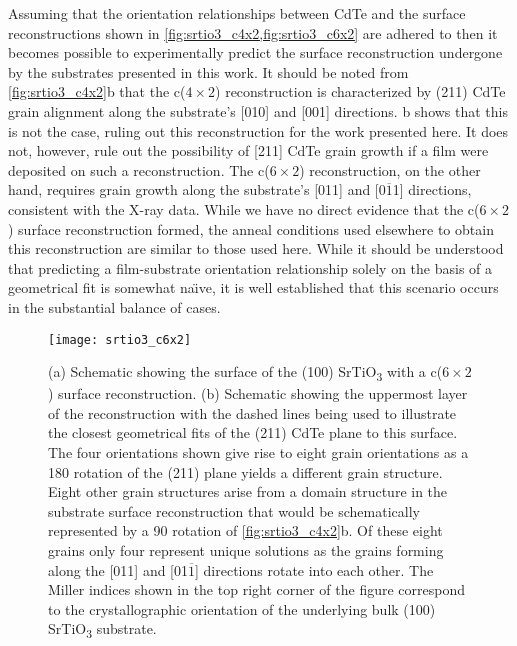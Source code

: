 Assuming that the orientation relationships between CdTe and the surface reconstructions shown in \cref{fig:srtio3_c4x2,fig:srtio3_c6x2} are adhered to then it becomes possible to experimentally predict the surface reconstruction undergone by the substrates presented in this work.
It should be noted from \cref{fig:srtio3_c4x2}b that the c(\(4\times2\)) reconstruction is characterized by (211) CdTe grain alignment along the substrate's [010] and [001] directions.
b shows that this is not the case, ruling out this reconstruction for the work presented here.
It does not, however, rule out the possibility of [211] CdTe grain growth if a film were deposited on such a reconstruction.
The c(\(6\times2\)) reconstruction, on the other hand, requires grain growth along the substrate's [011] and [0\(\overline{1}\)1] directions, consistent with the X-ray data.
While we have no direct evidence that the c(\(6\times2\)) surface reconstruction formed, the anneal conditions used elsewhere\cite{Jiang1996} to obtain this reconstruction are similar to those used here.
While it should be understood that predicting a film-substrate orientation relationship solely on the basis of a geometrical fit is somewhat na\"{\i}ve, it is well established that this scenario occurs in the substantial balance of cases.
\begin{figure}
 \centering \texttt{[image: srtio3\_c6x2]}
 \caption[CdTe on c(6\(\times\)2) SrTiO\textsubscript{3} surface]{\label{fig:srtio3_c6x2}(a) Schematic showing the surface of the (100) SrTiO\textsubscript{3} with a c(\(6\times2\)) surface reconstruction.
  (b) Schematic showing the uppermost layer of the reconstruction with the dashed lines being used to illustrate the closest geometrical fits of the (211) CdTe plane to this surface.
  The four orientations shown give rise to eight grain orientations as a 180\degree{} rotation of the (211) plane yields a different grain structure.
  Eight other grain structures arise from a domain structure in the substrate surface reconstruction that would be schematically represented by a 90\degree{} rotation of \cref{fig:srtio3_c4x2}b.
  Of these eight grains only four represent unique solutions as the grains forming along the [011] and [01\(\overline{1}\)] directions rotate into each other.
  The Miller indices shown in the top right corner of the figure correspond to the crystallographic orientation of the underlying bulk (100) SrTiO\textsubscript{3} substrate.}
\end{figure}


